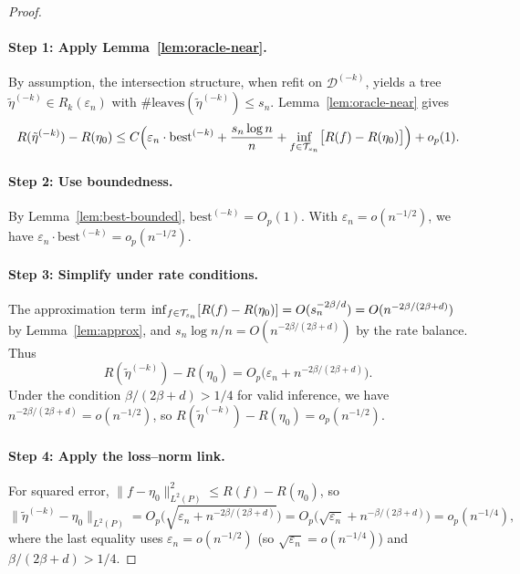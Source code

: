 \documentclass[12pt]{article}
\begin{document}
\begin{proof}
\paragraph{Step 1: Apply Lemma~\ref{lem:oracle-near}.}
By assumption, the intersection structure, when refit on $\mathcal{D}^{(-k)}$, yields a tree $\tilde{\eta}^{(-k)} \in R_k(\varepsilon_n)$ with $\#\text{leaves}(\tilde{\eta}^{(-k)}) \le s_n$. Lemma~\ref{lem:oracle-near} gives
\[
R(\tilde{\eta}^{(-k)}) - R(\eta_0) \le C \Bigl( \varepsilon_n \cdot \text{best}^{(-k)} + \frac{s_n \log n}{n} + \inf_{f \in \mathcal{T}_{s_n}} \bigl[ R(f) - R(\eta_0) \bigr] \Bigr) + o_p(1).
\]

\paragraph{Step 2: Use boundedness.}
By Lemma~\ref{lem:best-bounded}, $\text{best}^{(-k)} = O_p(1)$. With $\varepsilon_n = o(n^{-1/2})$, we have $\varepsilon_n \cdot \text{best}^{(-k)} = o_p(n^{-1/2})$.

\paragraph{Step 3: Simplify under rate conditions.}
The approximation term $\inf_{f \in \mathcal{T}_{s_n}}[R(f) - R(\eta_0)] = O(s_n^{-2\beta/d}) = O(n^{-2\beta/(2\beta+d)})$ by Lemma~\ref{lem:approx}, and $s_n \log n / n = O(n^{-2\beta/(2\beta+d)})$ by the rate balance. Thus
\[
R(\tilde{\eta}^{(-k)}) - R(\eta_0) = O_p\bigl( \varepsilon_n + n^{-2\beta/(2\beta+d)} \bigr).
\]
Under the condition $\beta/(2\beta+d) > 1/4$ for valid inference, we have $n^{-2\beta/(2\beta+d)} = o(n^{-1/2})$, so $R(\tilde{\eta}^{(-k)}) - R(\eta_0) = o_p(n^{-1/2})$.

\paragraph{Step 4: Apply the loss--norm link.}
For squared error, $\|f - \eta_0\|_{L^2(P)}^2 \le R(f) - R(\eta_0)$, so
\[
\|\tilde{\eta}^{(-k)} - \eta_0\|_{L^2(P)} = O_p\bigl( \sqrt{\varepsilon_n + n^{-2\beta/(2\beta+d)}} \bigr) = O_p\bigl( \sqrt{\varepsilon_n} + n^{-\beta/(2\beta+d)} \bigr) = o_p(n^{-1/4}),
\]
where the last equality uses $\varepsilon_n = o(n^{-1/2})$ (so $\sqrt{\varepsilon_n} = o(n^{-1/4})$) and $\beta/(2\beta+d) > 1/4$.
\end{proof}
\end{document}
